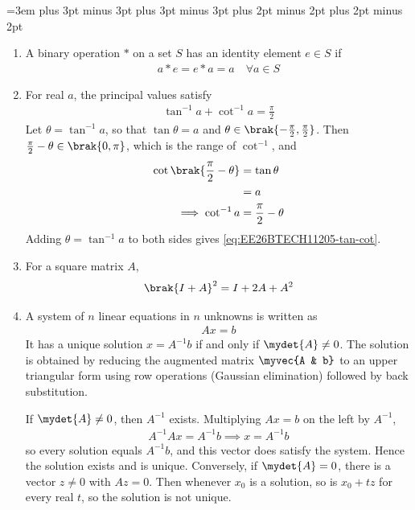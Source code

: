 \emergencystretch=3em
\renewcommand{\vec}[1]{#1}
\makeatletter
\g@addto@macro\normalsize{\abovedisplayskip=10pt plus 3pt minus 3pt \belowdisplayskip=10pt plus 3pt minus 3pt \abovedisplayshortskip=6pt plus 2pt minus 2pt \belowdisplayshortskip=8pt plus 2pt minus 2pt \jot=5pt}
\makeatother
\normalsize
\begin{enumerate}[label=\thesubsection.\arabic*, ref=\thesubsection.\theenumi]
\item A binary operation $*$ on a set $S$ has an identity element $e \in S$ if
\begin{align}
	a * e = e * a = a \quad \forall a \in S \label{eq:EE26BTECH11205-identity}
\end{align}
\item For real $a$, the principal values satisfy
\begin{align}
	\tan^{-1} a + \cot^{-1} a = \frac{\pi}{2} \label{eq:EE26BTECH11205-tan-cot}
\end{align}
\solution Let $\theta = \tan^{-1}a$, so that $\tan\theta = a$ and $\theta \in \brak{-\frac{\pi}{2},\frac{\pi}{2}}$. Then $\frac{\pi}{2}-\theta \in \brak{0,\pi}$, which is the range of $\cot^{-1}$, and
\begin{align}
	\cot\brak{\frac{\pi}{2}-\theta} &= \tan\theta \notag
	\\
	&= a \notag
	\\
	\implies \cot^{-1}a &= \frac{\pi}{2}-\theta
\end{align}
Adding $\theta = \tan^{-1}a$ to both sides gives \eqref{eq:EE26BTECH11205-tan-cot}.
\item For a square matrix $\vec{A}$,
\begin{align}
	\brak{\vec{I}+\vec{A}}^2 = \vec{I} + 2\vec{A} + \vec{A}^2 \label{eq:EE26BTECH11205-idem-binom}
\end{align}
\item A system of $n$ linear equations in $n$ unknowns is written as
\begin{align}
	\vec{A}\vec{x} = \vec{b} \label{eq:EE26BTECH11205-linsys}
\end{align}
It has a unique solution $\vec{x} = \vec{A}^{-1}\vec{b}$ if and only if $\mydet{\vec{A}} \neq 0$. The solution is obtained by reducing the augmented matrix $\myvec{\vec{A} & \vec{b}}$ to an upper triangular form using row operations (Gaussian elimination) followed by back substitution.

\medskip
\solution If $\mydet{\vec{A}} \neq 0$, then $\vec{A}^{-1}$ exists. Multiplying $\vec{A}\vec{x} = \vec{b}$ on the left by $\vec{A}^{-1}$,
\begin{align}
	\vec{A}^{-1}\vec{A}\vec{x} = \vec{A}^{-1}\vec{b} \implies \vec{x} = \vec{A}^{-1}\vec{b}
\end{align}
so every solution equals $\vec{A}^{-1}\vec{b}$, and this vector does satisfy the system. Hence the solution exists and is unique. Conversely, if $\mydet{\vec{A}} = 0$, there is a vector $\vec{z} \neq \vec{0}$ with $\vec{A}\vec{z} = \vec{0}$. Then whenever $\vec{x}_0$ is a solution, so is $\vec{x}_0 + t\vec{z}$ for every real $t$, so the solution is not unique.


\end{enumerate}
